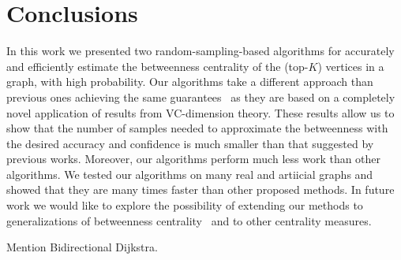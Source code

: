 \section{Conclusions}\label{sec:concl}
In this work we presented two random-sampling-based algorithms for accurately and
efficiently estimate the betweenness centrality of the (top-$K$) vertices in a
graph, with high probability.
Our algorithms take a different approach than previous ones achieving the same
guarantees~\citep{BrandesP07,GeisbergerSS08,JacobKLPT05} as they are based on a
completely novel application of results from VC-dimension theory. These results
allow us to show that the number of samples needed to approximate the
betweenness with the desired accuracy and confidence is much smaller than that
suggested by previous works. Moreover, our algorithms perform much less work
than other algorithms. We tested our algorithms on many real and artiicial
graphs and showed that they are many times faster than other proposed methods.
In future work we would like to explore the possibility of extending our methods
to generalizations of betweenness centrality~\citep{KourtellisASIT12,DolevEP10}
and to other centrality measures.

\XXX Mention Bidirectional Dijkstra.

